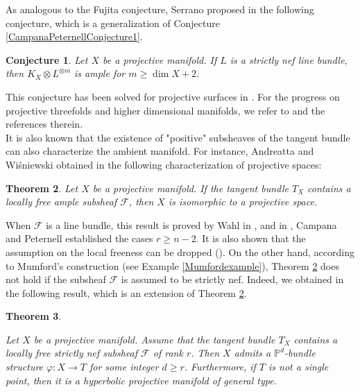\documentclass[english,reqno]{amsart}
\newcommand\bbP{{\mathbb P}}
\newcommand\sF{{\mathscr F}}
\theoremstyle{plain}
\newtheorem{thm}{Theorem}[section]
\newtheorem{conj}[thm]{Conjecture}
\theoremstyle{definition}
\numberwithin{equation}{section} %
\begin{document}
\noindent  As analogous to the Fujita conjecture, Serrano proposed in \cite{Serrano1995} the following conjecture, which is a generalization of Conjecture \ref{CampanaPeternellConjecture1}.



\begin{conj}\label{Serranoconjecture1} Let $X$ be a projective manifold. If $L$ is a strictly nef line bundle, then $K_X\otimes L^{\otimes m}$ is ample for  $m\geq \dim X+2$.
\end{conj}


\noindent This conjecture has been solved for projective surfaces in \cite{Serrano1995}. For the progress on projective threefolds and higher dimensional manifolds, we refer to \cite[Theorem~0.4]{CampanaChenPeternell2008} and the references therein.\\


It is also known that the existence of "positive" subsheaves of the
tangent bundle can also characterize  the
ambient manifold. For instance,  Andreatta and Wi\'sniewski obtained in \cite[Theorem]{AndreattaWisniewski2001}
the following characterization of projective spaces:
\begin{thm}
    \label{thm:Andreatta-Wisniewski1}
    Let $X$ be a projective manifold. If the tangent bundle $T_X$ contains a locally free ample subsheaf $\sF$, then $X$ is isomorphic to a projective space.
\end{thm}


\noindent When $\sF$ is a line bundle, this result is proved by
Wahl in \cite{Wahl1983}, and in \cite{CampanaPeternell1998}, Campana and
Peternell established the cases $r\geqslant n-2$. It is also shown that the assumption on the  local freeness can be
dropped (\cite{AproduKebekusPeternell2008,Liu2019}). On the other hand, according to Mumford's construction (see Example \ref{Mumfordexample}), Theorem \ref{thm:Andreatta-Wisniewski1}
does not hold  if the subsheaf $\sF$ is  assumed to be strictly nef. Indeed, we  obtained in \cite[Theorem~1.3]{LiuOuYang2020} the following  result, which is an extension of
Theorem \ref{thm:Andreatta-Wisniewski1}.

\begin{thm} \label{thm:main-theorem1}
	
	Let $X$ be a   projective manifold. Assume that the tangent bundle $T_X$ contains a locally free strictly nef subsheaf $\sF$ of rank $r$.
	Then $X$ admits a $\bbP^d$-bundle structure $\varphi\colon X\rightarrow T$ for some integer $d\geq r$.
	Furthermore, if $T$ is not a single point, then it is a hyperbolic projective manifold of general type.
\end{thm}
\end{document}
